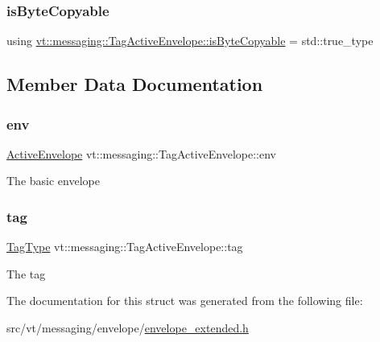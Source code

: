 \subsubsection{\texorpdfstring{is\+Byte\+Copyable}{isByteCopyable}}
{\footnotesize\ttfamily using \hyperlink{structvt_1_1messaging_1_1_tag_active_envelope_a25b95de57b90351e8b017ea2742eadc2}{vt\+::messaging\+::\+Tag\+Active\+Envelope\+::is\+Byte\+Copyable} =  std\+::true\+\_\+type}



\subsection{Member Data Documentation}
\mbox{\label{structvt_1_1messaging_1_1_tag_active_envelope_a407d7bb06664c813df052dac889f8f3a}} 
\subsubsection{\texorpdfstring{env}{env}}
{\footnotesize\ttfamily \hyperlink{structvt_1_1messaging_1_1_active_envelope}{Active\+Envelope} vt\+::messaging\+::\+Tag\+Active\+Envelope\+::env}

The basic envelope \mbox{\label{structvt_1_1messaging_1_1_tag_active_envelope_ab5fdfcb898f8e0ca0b5c580018824766}} 
\subsubsection{\texorpdfstring{tag}{tag}}
{\footnotesize\ttfamily \hyperlink{namespacevt_a84ab281dae04a52a4b243d6bf62d0e52}{Tag\+Type} vt\+::messaging\+::\+Tag\+Active\+Envelope\+::tag}

The tag 

The documentation for this struct was generated from the following file\+:\begin{DoxyCompactItemize}
\item 
src/vt/messaging/envelope/\hyperlink{envelope__extended_8h}{envelope\+\_\+extended.\+h}\end{DoxyCompactItemize}
